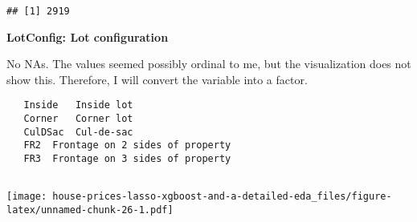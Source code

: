 \documentclass[]{article}
\newenvironment{Shaded}{\begin{snugshade}}{\end{snugshade}}
\newcommand{\KeywordTok}[1]{\textcolor[rgb]{0.13,0.29,0.53}{\textbf{#1}}}
\newcommand{\DataTypeTok}[1]{\textcolor[rgb]{0.13,0.29,0.53}{#1}}
\newcommand{\DecValTok}[1]{\textcolor[rgb]{0.00,0.00,0.81}{#1}}
\newcommand{\StringTok}[1]{\textcolor[rgb]{0.31,0.60,0.02}{#1}}
\newcommand{\OperatorTok}[1]{\textcolor[rgb]{0.81,0.36,0.00}{\textbf{#1}}}
\newcommand{\NormalTok}[1]{#1}
\begin{document}
\begin{verbatim}
## [1] 2919
\end{verbatim}

\textbf{LotConfig: Lot configuration}

No NAs. The values seemed possibly ordinal to me, but the visualization
does not show this. Therefore, I will convert the variable into a
factor.

\begin{verbatim}
   Inside   Inside lot
   Corner   Corner lot
   CulDSac  Cul-de-sac
   FR2  Frontage on 2 sides of property
   FR3  Frontage on 3 sides of property
   
\end{verbatim}

\begin{Shaded}
\end{Shaded}

\texttt{[image: house-prices-lasso-xgboost-and-a-detailed-eda\_files/figure-latex/unnamed-chunk-26-1.pdf]}

\begin{Shaded}
\end{Shaded}
\end{document}
